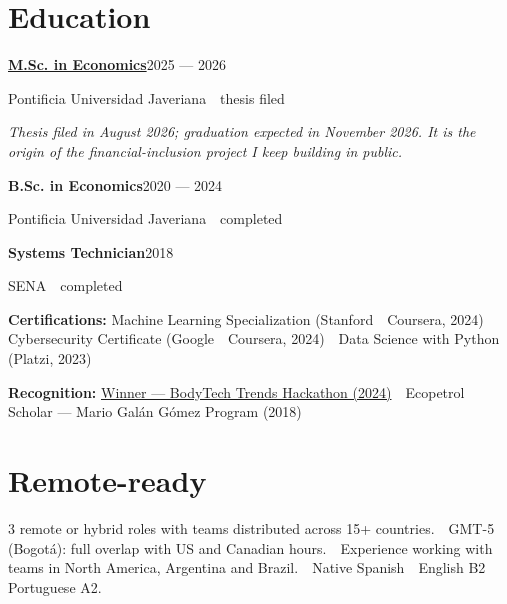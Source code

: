 \documentclass[a4paper,10pt]{article}
\newcommand{\headline}[2]{\needspace{3\baselineskip}\textbf{\color{ink}#1}\hfill{\small #2}\par}
\begin{document}
\section*{Education}
\headline{\href{https://proyecto-davirson-git.vercel.app/en/research/fintech-inclusion}{M.Sc. in Economics}}{2025 --- 2026}
{\small Pontificia Universidad Javeriana \,\textperiodcentered\, thesis filed}\par
{\small\itshape Thesis filed in August 2026; graduation expected in November 2026. It is the origin of the financial-inclusion project I keep building in public.}\par
\vspace{1pt}
\headline{B.Sc. in Economics}{2020 --- 2024}
{\small Pontificia Universidad Javeriana \,\textperiodcentered\, completed}\par
\vspace{1pt}
\headline{Systems Technician}{2018}
{\small SENA \,\textperiodcentered\, completed}\par
\vspace{1pt}
\vspace{3pt}
\textbf{\color{ink}Certifications:} Machine Learning Specialization (Stanford \,\textperiodcentered\, Coursera, 2024) \,\textperiodcentered\, Cybersecurity Certificate (Google \,\textperiodcentered\, Coursera, 2024) \,\textperiodcentered\, Data Science with Python (Platzi, 2023)\par\vspace{3pt}
\textbf{\color{ink}Recognition:} \href{https://public.tableau.com/app/profile/davirson.novoa/viz/BodyTrendsADataAnalysisProject/TrendsAnalysis}{Winner --- BodyTech Trends Hackathon (2024)} \,\textperiodcentered\, Ecopetrol Scholar --- Mario Galán Gómez Program (2018)\par

\section*{Remote-ready}
3 remote or hybrid roles with teams distributed across 15+ countries. \,\textperiodcentered\, GMT-5 (Bogotá): full overlap with US and Canadian hours. \,\textperiodcentered\, Experience working with teams in North America, Argentina and Brazil. \,\textperiodcentered\, Native Spanish \,\textperiodcentered\, English B2 \,\textperiodcentered\, Portuguese A2.
\end{document}
